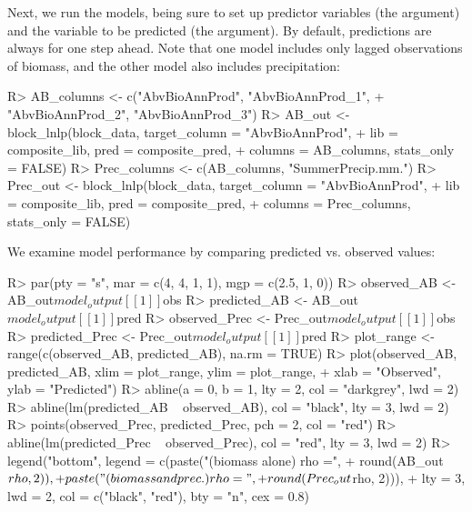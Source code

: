 \documentclass[article]{jss}
\begin{document}
Next, we run the models, being sure to set up predictor variables (the  argument) and the variable to be predicted (the  argument). By default, predictions are always for one step ahead. Note that one model includes only lagged observations of biomass, and the other model also includes precipitation:

\begin{Schunk}
\begin{Sinput}
R> AB_columns <- c("AbvBioAnnProd", "AbvBioAnnProd_1", 
+                  "AbvBioAnnProd_2", "AbvBioAnnProd_3")
R> AB_out <- block_lnlp(block_data, target_column = "AbvBioAnnProd", 
+                       lib = composite_lib, pred = composite_pred, 
+                       columns = AB_columns, stats_only = FALSE)
R> Prec_columns <- c(AB_columns, "SummerPrecip.mm.")
R> Prec_out <- block_lnlp(block_data, target_column = "AbvBioAnnProd", 
+                         lib = composite_lib, pred = composite_pred, 
+                         columns = Prec_columns, stats_only = FALSE)
\end{Sinput}
\end{Schunk}

We examine model performance by comparing predicted vs. observed values:
\begin{Schunk}
\begin{Sinput}
R> par(pty = "s", mar = c(4, 4, 1, 1), mgp = c(2.5, 1, 0))
R> observed_AB <- AB_out$model_output[[1]]$obs
R> predicted_AB <- AB_out$model_output[[1]]$pred
R> observed_Prec <- Prec_out$model_output[[1]]$obs
R> predicted_Prec <- Prec_out$model_output[[1]]$pred
R> plot_range <- range(c(observed_AB, predicted_AB), na.rm = TRUE)
R> plot(observed_AB, predicted_AB, xlim = plot_range, ylim = plot_range, 
+       xlab = "Observed", ylab = "Predicted")
R> abline(a = 0, b = 1, lty = 2, col = "darkgrey", lwd = 2)
R> abline(lm(predicted_AB ~ observed_AB), col = "black", lty = 3, lwd = 2)
R> points(observed_Prec, predicted_Prec, pch = 2, col = "red")
R> abline(lm(predicted_Prec ~ observed_Prec), col = "red", lty = 3, lwd = 2)
R> legend("bottom", legend = c(paste("(biomass alone) rho =", 
+                                    round(AB_out$rho, 2)), 
+                               paste("(biomass and prec.) rho =", 
+                                     round(Prec_out$rho, 2))), 
+         lty = 3, lwd = 2, col = c("black", "red"), bty = "n", cex = 0.8)
\end{Sinput}
\end{Schunk}
\end{document}
